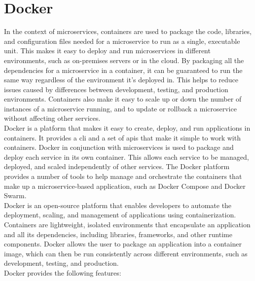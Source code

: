 \section{Docker}
In the context of microservices, containers are used to package the code, libraries, and configuration files needed for a microservice to run as a single, executable unit. This makes it easy to deploy and run microservices in different environments, such as on-premises servers or in the cloud. By packaging all the dependencies for a microservice in a container, it can be guaranteed to run the same way regardless of the environment it's deployed in. This helps to reduce issues caused by differences between development, testing, and production environments. Containers also make it easy to scale up or down the number of instances of a microservice running, and to update or rollback a microservice without affecting other services.\vspace{5mm} \\
Docker is a platform that makes it easy to create, deploy, and run applications in containers. It provides a \gls{cli} and a set of \glspl{api} that make it simple to work with containers. Docker in conjunction with microservices is used to package and deploy each service in its own container. This allows each service to be managed, deployed, and scaled independently of other services. The Docker platform provides a number of tools to help manage and orchestrate the containers that make up a microservice-based application, such as Docker Compose and Docker Swarm.\vspace{5mm} \\
Docker is an open-source platform that enables developers to automate the deployment, scaling, and management of applications using containerization. Containers are lightweight, isolated environments that encapsulate an application and all its dependencies, including libraries, frameworks, and other runtime components. Docker allows the user to package an application into a container image, which can then be run consistently across different environments, such as development, testing, and production.\vspace{5mm} \\
Docker provides the following features:
